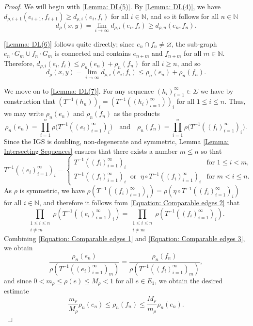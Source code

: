 \documentclass{amsart}
\numberwithin{equation}{section}
\theoremstyle{definition}
\theoremstyle{remark}
\newcommand{\N}{\mathbb{N}}
\begin{document}
\begin{proof}
    We will begin with \ref{Lemma: DL(5)}. By \ref{Lemma: DL(4)}, we have  \(d_{\rho,i+1}(e_{i+1},f_{i+1})\geq d_{\rho,i}(e_i,f_i)\) for all \(i\in\N\), and so it follows for all \(n\in \N\) 
        \[
            d_{\rho}(x,y)=\lim_{i\to\infty}d_{\rho,i}(e_i,f_i)\geq d_{\rho,n}(e_n,f_n).
        \]

    \ref{Lemma: DL(6)} follows quite directly; since \(e_n\cap f_n\neq \varnothing\), the sub-graph \(e_n\cdot G_m\cup f_n\cdot G_m\) is connected and contains \(e_{n+m}\) and \(f_{n+m}\) for all \(m\in\N\). Therefore, \(d_{\rho,i}(e_i,f_i)\leq \rho_n(e_n)+\rho_n(f_n)\) for all \(i\geq n\), and so 
        \[
            d_\rho(x,y)=\lim_{i\to\infty}d_{\rho,i}(e_i,f_i)\leq \rho_n(e_n)+\rho_n(f_n).
        \]

     We move on to \ref{Lemma: DL(7)}. For any sequence \((h_i)_{i=1}^\infty\in \Sigma \) we have by construction that \((T^{-1}(h_n))_i=(T^{-1}((h_i)_{i=1}^\infty))_i\) for all \(1\leq i \leq n\). Thus, we may write \(\rho_n(e_n)\) and \(\rho_n(f_n)\) as the products
        \begin{equation}\label{Equation: Comparable edges 1}
            \rho_n(e_n)=\prod_{i=1}^n\rho\big(T^{-1}((e_i)_{i=1}^\infty)_i\big)\quad\text{and}\quad\rho_n(f_n)=\prod_{i=1}^n\rho\big(T^{-1}((f_i)_{i=1}^\infty)_i\big).
        \end{equation}
    Since the IGS is doubling, non-degenerate and symmetric, Lemma \ref{Lemma: Intersecting Sequences} ensures that there exists a number \(m\leq n\) so that
        \begin{equation}\label{Equation: Comparable edges 2}
            T^{-1}((e_i)_{i=1}^\infty)_i=
            \begin{cases}
                T^{-1}((f_i)_{i=1}^\infty)_i&\text{for } 1\leq i< m,\\
                T^{-1}((f_i)_{i=1}^\infty)_i \;\text{ or }\; \eta\circ T^{-1}((f_i)_{i=1}^\infty)_i&\text{for }m< i\leq n.
            \end{cases}
        \end{equation}
    As \(\rho\) is symmetric, we have \(\rho(T^{-1}((f_i)_{i=1}^\infty)_i)=\rho(\eta\circ T^{-1}((f_i)_{i=1}^\infty)_i)\) for all \(i\in\N\), and therefore it follows from \eqref{Equation: Comparable edges 2} that
        \begin{equation}\label{Equation: Comparable edges 3}
            \prod_{\substack{1\leq i\leq n\\ i\neq m }}\rho(T^{-1}((e_i)_{i=1}^\infty)_i)=\prod_{\substack{1\leq i\leq n\\ i\neq m }}\rho(T^{-1}((f_i)_{i=1}^\infty)_i).
        \end{equation}
    Combining \eqref{Equation: Comparable edges 1} and \eqref{Equation: Comparable edges 3}, we obtain
        \[
            \frac{\rho_n(e_n)}{\rho(T^{-1}((e_i)_{i=1}^\infty)_m)}=\frac{\rho_n(f_n)}{\rho(T^{-1}((f_i)_{i=1}^\infty)_m)},
        \]
    and since \(0<m_\rho\leq \rho(e)\leq  M_\rho<1\) for all \(e\in E_1\), we obtain the desired estimate
        \[
            \frac{m_\rho}{M_\rho}\rho_n(e_n)\leq \rho_n(f_n)\leq \frac{M_\rho}{m_\rho}\rho_n(e_n).
        \]


\end{proof}
\end{document}
